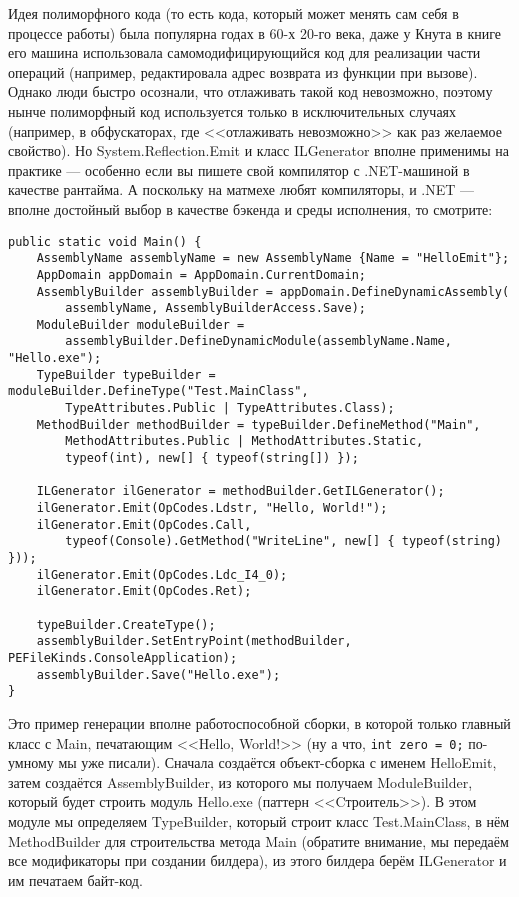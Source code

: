 \documentclass[a5paper]{article}
\begin{document}
Идея полиморфного кода (то есть кода, который может менять сам себя в процессе работы) была популярна годах в 60-х 20-го века, даже у Кнута в книге его машина использовала самомодифицирующийся код для реализации части операций (например, редактировала адрес возврата из функции при вызове). Однако люди быстро осознали, что отлаживать такой код невозможно, поэтому нынче полиморфный код используется только в исключительных случаях (например, в обфускаторах, где <<отлаживать невозможно>> как раз желаемое свойство). Но System.Reflection.Emit и класс ILGenerator вполне применимы на практике --- особенно если вы пишете свой компилятор с .NET-машиной в качестве рантайма. А поскольку на матмехе любят компиляторы, и .NET --- вполне достойный выбор в качестве бэкенда и среды исполнения, то смотрите:

\begin{verbatim}
public static void Main() {
    AssemblyName assemblyName = new AssemblyName {Name = "HelloEmit"};
    AppDomain appDomain = AppDomain.CurrentDomain;
    AssemblyBuilder assemblyBuilder = appDomain.DefineDynamicAssembly(
        assemblyName, AssemblyBuilderAccess.Save);
    ModuleBuilder moduleBuilder = 
        assemblyBuilder.DefineDynamicModule(assemblyName.Name, "Hello.exe");
    TypeBuilder typeBuilder = moduleBuilder.DefineType("Test.MainClass",
        TypeAttributes.Public | TypeAttributes.Class);
    MethodBuilder methodBuilder = typeBuilder.DefineMethod("Main",
        MethodAttributes.Public | MethodAttributes.Static,
        typeof(int), new[] { typeof(string[]) });

    ILGenerator ilGenerator = methodBuilder.GetILGenerator();
    ilGenerator.Emit(OpCodes.Ldstr, "Hello, World!");
    ilGenerator.Emit(OpCodes.Call,
        typeof(Console).GetMethod("WriteLine", new[] { typeof(string) }));
    ilGenerator.Emit(OpCodes.Ldc_I4_0);
    ilGenerator.Emit(OpCodes.Ret);

    typeBuilder.CreateType();
    assemblyBuilder.SetEntryPoint(methodBuilder, PEFileKinds.ConsoleApplication);
    assemblyBuilder.Save("Hello.exe");
}
\end{verbatim}

Это пример генерации вполне работоспособной сборки, в которой только главный класс с Main, печатающим <<Hello, World!>> (ну а что, \texttt{int zero = 0;} по-умному мы уже писали). Сначала создаётся объект-сборка с именем HelloEmit, затем создаётся AssemblyBuilder, из которого мы получаем ModuleBuilder, который будет строить модуль Hello.exe (паттерн <<Cтроитель>>). В этом модуле мы определяем TypeBuilder, который строит класс Test.MainClass, в нём MethodBuilder для строительства метода Main (обратите внимание, мы передаём все модификаторы при создании билдера), из этого билдера берём ILGenerator и им печатаем байт-код.
\end{document}
